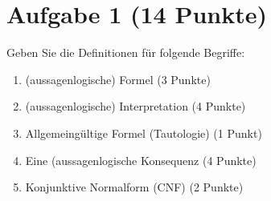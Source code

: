 \documentclass[12pt,a4paper]{article}
\author{Willi Sontopski}
\begin{document}

\section*{Aufgabe 1 (14 Punkte)}
Geben Sie die Definitionen für folgende Begriffe:
\begin{enumerate}
\item (aussagenlogische) Formel (3 Punkte)
\item (aussagenlogische) Interpretation (4 Punkte)
\item Allgemeingültige Formel (Tautologie) (1 Punkt)
\item Eine (aussagenlogische Konsequenz (4 Punkte)
\item Konjunktive Normalform (CNF) (2 Punkte)
\end{enumerate}
\end{document}
